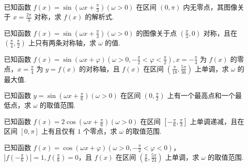 \documentclass[a4paper , final]{ctexart}
\newenvironment{problem}[1]{%
  \item #1
  \par
  \vspace{8cm}
}{}
\begin{document}
\begin{problems}
    \begin{problem}
        {
            已知函数 $f(x) = \sin(\omega x +\frac{\pi}{3})(\omega > 0)$ 在区间 $(0,\pi)$ 内无零点，其图像关于 $x=\frac{2\pi}{3}$ 对称，求 $f(x)$ 的解析式.
        }
    \end{problem}

    \begin{problem}
        {
            已知函数 $f(x) = \sin(\omega x +\frac{\pi}{3})(\omega > 0)$ 的图像关于点 $(\frac{\pi}{3},0)$ 对称，且在 $(\frac{\pi}{4},\frac{\pi}{2})$ 上只有两条对称轴，求 $\omega$ 的值.
        }
    \end{problem}
    
    \begin{problem}
        {
            已知函数 $f(x) = \sin(\omega x +\varphi)(\omega > 0,-\frac{\pi}{2}<\varphi<\frac{\pi}{2}),x=-\frac{\pi}   {4}$ 为 $f(x)$ 的零点，$x=\frac{\pi}{4}$ 为 $y=f(x)$ 的对称轴，且 $f(x)$ 在区间 $\left(\frac{\pi}  {18},\frac{5\pi}{36}\right)$ 上单调，求 $\omega$ 的最大值.
        }
    \end{problem}

    \begin{problem}
        {
            已知函数 $y = \sin(\omega x +\frac{\pi}{6})(\omega > 0)$ 在区间 $(0,\frac{\pi}{2})$ 上有一个最高点和一个最低点，求 $\omega$ 的取值范围.
        }
    \end{problem}
    
    \begin{problem}
        {
            已知函数 $f(x) = 2\cos(\omega x +\frac{\pi}{6})(\omega > 0)$ 在区间 $[-\frac{\pi}{6},\frac{\pi}{3}]$ 上单调递减，且在区间 $[0,\pi]$ 上有且仅有 $1$ 个零点，求 $\omega$ 的取值范围.
        }
    \end{problem}

    \begin{problem}
        {
            已知函数 $f(x) = \cos(\omega x +\varphi)(\omega > 0,-\frac{\pi}{2}<\varphi<0)$，$\left\vert f(-\frac{\pi}{6})\right\vert=1,f(\frac{\pi}{6})=0$，且 $f(x)$ 在区间 $\left(\frac{\pi}{6},\frac{5\pi}{24}\right)$ 上单调，求 $\omega$ 的取值范围.
        }
    \end{problem}
\end{problems}
\end{document}
